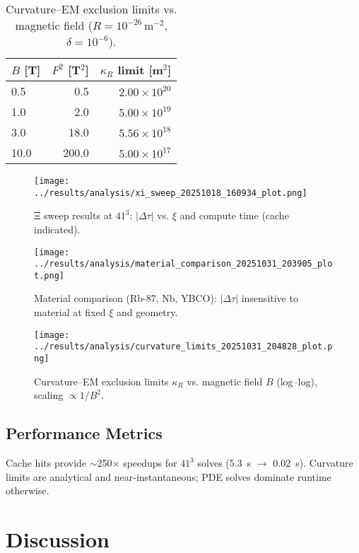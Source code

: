 \documentclass[10pt,twocolumn]{article}
\begin{document}
\begin{table}[t]
  \centering
  \caption{Curvature--EM exclusion limits vs. magnetic field ($R=10^{-26}\,\mathrm{m^{-2}}$, $\delta=10^{-6}$).}
  \label{tab:kappaB}
  \begin{tabular}{@{}lrr@{}}
    \toprule
    $B$ [T] & $F^2$ [T$^2$] & $\kappa_R$ limit [m$^2$] \\
    \midrule
    0.5  &  0.5  & $2.00\times10^{20}$ \\
    1.0  &  2.0  & $5.00\times10^{19}$ \\
    3.0  & 18.0  & $5.56\times10^{18}$ \\
    10.0 & 200.0 & $5.00\times10^{17}$ \\
    \bottomrule
  \end{tabular}
\end{table}

\begin{figure*}[t]
  \centering
  \texttt{[image: ../results/analysis/xi\_sweep\_20251018\_160934\_plot.png]}
  \caption{Ξ sweep results at $41^3$: $|\Delta\tau|$ vs. $\xi$ and compute time (cache indicated).}
  \label{fig:xi_sweep}
\end{figure*}

\begin{figure}[h]
  \centering
  \texttt{[image: ../results/analysis/material\_comparison\_20251031\_203905\_plot.png]}
  \caption{Material comparison (Rb-87, Nb, YBCO): $|\Delta\tau|$ insensitive to material at fixed $\xi$ and geometry.}
  \label{fig:materials}
\end{figure}

\begin{figure}[h]
  \centering
  \texttt{[image: ../results/analysis/curvature\_limits\_20251031\_204828\_plot.png]}
  \caption{Curvature--EM exclusion limits $\kappa_R$ vs. magnetic field $B$ (log--log), scaling $\propto 1/B^2$.}
  \label{fig:kappa_vs_B}
\end{figure}

\subsection{Performance Metrics}
Cache hits provide $\sim$250$\times$ speedups for $41^3$ solves (5.3~s $\rightarrow$ 0.02~s). Curvature limits are analytical and near-instantaneous; PDE solves dominate runtime otherwise.

\section{Discussion}
\end{document}
